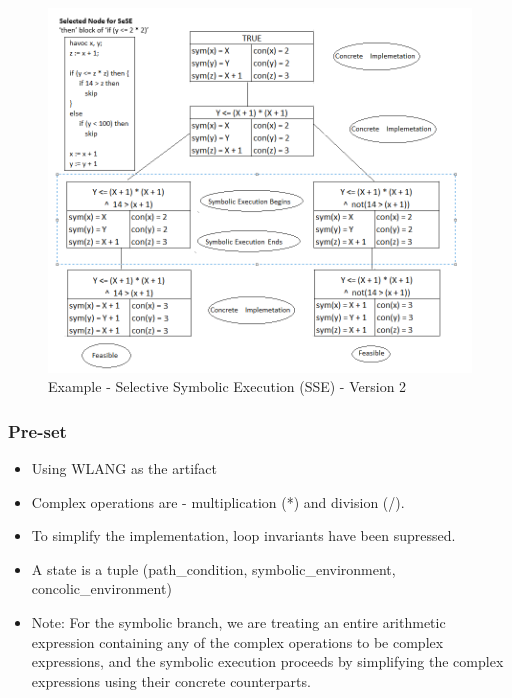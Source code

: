 \documentclass[11pt]{llncs}
\begin{document}
			\begin{figure}[H]
				\includegraphics[width=1.05\textwidth]{SeSE_Version2_Example.png}
				\caption{Example - Selective Symbolic Execution (SSE) - Version 2} \label{fig_5}
			\end{figure}

		\vspace{-13mm}

		\subsubsection{Pre-set}
			\begin{itemize}
				\vspace{-2mm}
				\item Using WLANG as the artifact
				\item Complex operations are - multiplication (*) and division (/).
				\item To simplify the implementation, loop invariants have been supressed.
				\item A state is a tuple (path\_condition, symbolic\_environment, concolic\_environment)
				\item Note: For the symbolic branch, we are treating an entire arithmetic expression containing any of the complex operations to be complex expressions, and the symbolic execution proceeds by simplifying the complex expressions using their concrete counterparts.
			\end{itemize}
\end{document}
